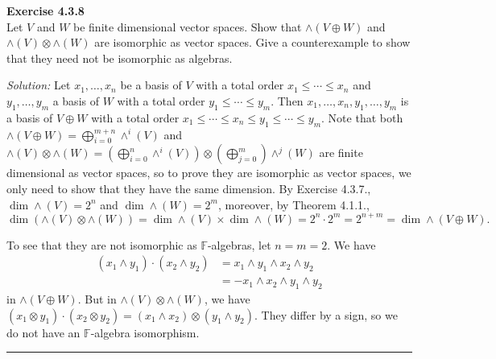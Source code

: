 \documentclass[a4paper, 12pt]{article}
\newenvironment{problem}[2][Exercise]
    { \begin{mdframed}[backgroundcolor=gray!20] \textbf{#1 #2} \\}
    {  \end{mdframed}}
\newenvironment{solution}
    {\textit{Solution:}}
    {}
\begin{document}
\begin{problem}{4.3.8}
Let \(V\) and \(W\) be finite dimensional vector spaces. Show that \(\wedge (V\oplus W)\) and \(\wedge (V)\otimes \wedge (W)\) are isomorphic as vector spaces. Give a 
counterexample to show that they need not be isomorphic as algebras.
\end{problem}
\begin{solution}
Let \(x_1,\ldots,x_n\) be a basis of \(V\) with a total order \(x_1\leq \cdots\leq x_n\) and \(y_1,\ldots,y_m\) a basis of \(W\) with a total order \(y_1\leq \cdots\leq y_m\). Then \(x_1,\ldots,x_n,y_1,\ldots,y_m\) is a basis of 
\(V\oplus W\) with a total order \(x_1\leq \cdots\leq x_n\leq y_1\leq \cdots\leq y_m\). Note that both \(\wedge(V\oplus W)=\bigoplus_{i=0}^{m+n} \wedge^i(V)\) and \(\wedge(V)\otimes \wedge(W)=(\bigoplus_{i=0}^n\wedge^i(V))\otimes (\bigoplus_{j=0}^m) \wedge^j(W)\) are 
finite dimensional as vector spaces, so to prove they are isomorphic as vector spaces, we only need to show that they have the same dimension. By Exercise 4.3.7., \(\dim \wedge (V)=2^n\) and \(\dim \wedge (W)=2^m\), moreover, by Theorem 4.1.1., 
\[\dim (\wedge(V)\otimes \wedge(W))=\dim \wedge(V)\times \dim \wedge(W)=2^n\cdot 2^m=2^{n+m}=\dim \wedge(V\oplus W).\]
\par 
To see that they are not isomorphic as \(\mathbb{F}\)-algebras, let \(n=m=2\). We have 
\begin{align*}
	(x_1\wedge y_1)\cdot(x_2\wedge y_2) & =x_1\wedge y_1\wedge x_2\wedge y_2\\ 
	                                    & =-x_1\wedge x_2\wedge y_1\wedge y_2
\end{align*}
in \(\wedge (V\oplus W)\). But in \(\wedge(V)\otimes \wedge(W)\), we have \((x_1\otimes y_1)\cdot(x_2\otimes y_2)=(x_1\wedge x_2)\otimes (y_1\wedge y_2)\). They differ by a sign, so we do not have an 
\(\mathbb{F}\)-algebra isomorphism.
\end{solution}

\noindent\rule{7in}{2.8pt}
\end{document}
